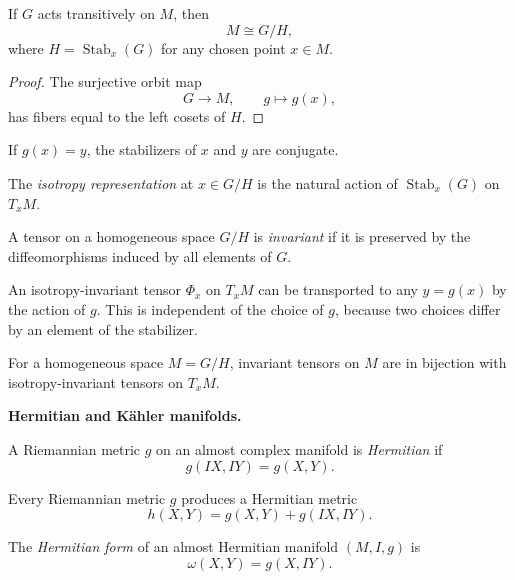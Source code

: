 \begin{proposition}
\label{proposition-homogeneous-quotient}
If $G$ acts transitively on $M$, then
$$
M\cong G/H,
$$
where $H=\operatorname{Stab}_x(G)$ for any
chosen point $x\in M$.
\end{proposition}

\begin{proof}
The surjective orbit map
$$
G\longrightarrow M,
\qquad
g\longmapsto g(x),
$$
has fibers equal to the left cosets of $H$.
\end{proof}

If $g(x)=y$, the stabilizers of $x$ and $y$
are conjugate.

\begin{definition}
\label{definition-isotropy-representation}
The {\it isotropy representation} at
$x\in G/H$ is the natural action of
$\operatorname{Stab}_x(G)$ on $T_xM$.
\end{definition}

\begin{definition}
\label{definition-invariant-tensor}
A tensor on a homogeneous space $G/H$ is
{\it invariant} if it is preserved by the
diffeomorphisms induced by all elements of
$G$.
\end{definition}

An isotropy-invariant tensor $\Phi_x$ on
$T_xM$ can be transported to any
$y=g(x)$ by the action of $g$. This is
independent of the choice of $g$, because
two choices differ by an element of the
stabilizer.

\begin{theorem}
\label{theorem-invariant-isotropy-tensors}
For a homogeneous space $M=G/H$, invariant
tensors on $M$ are in bijection with
isotropy-invariant tensors on $T_xM$.
\end{theorem}

\medskip\noindent
{\bf Hermitian and K\"ahler manifolds.}

\begin{definition}
\label{definition-hermitian-metric-manifold}
A Riemannian metric $g$ on an almost complex
manifold is {\it Hermitian} if
$$
g(IX,IY)=g(X,Y).
$$
\end{definition}

Every Riemannian metric $g$ produces a
Hermitian metric
$$
h(X,Y)=g(X,Y)+g(IX,IY).
$$

\begin{definition}
\label{definition-hermitian-form-manifold}
The {\it Hermitian form} of an almost
Hermitian manifold $(M,I,g)$ is
$$
\omega(X,Y)=g(X,IY).
$$
\end{definition}

